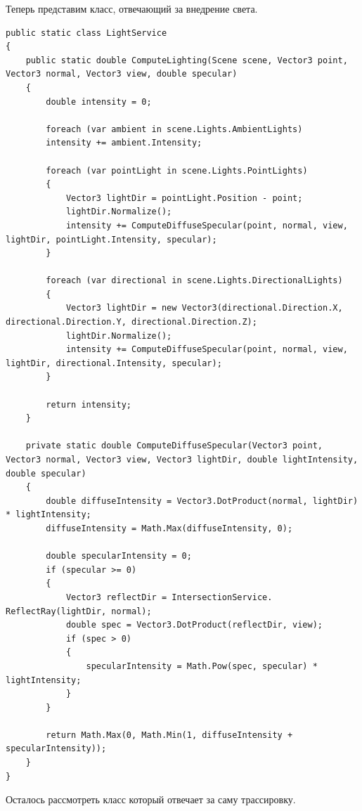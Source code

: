 Теперь представим класс, отвечающий за внедрение света.
\begin{lstlisting}[caption={Класс LightService}, label={lst:3-3}]
public static class LightService
{
	public static double ComputeLighting(Scene scene, Vector3 point, Vector3 normal, Vector3 view, double specular)
	{
		double intensity = 0;
		
		foreach (var ambient in scene.Lights.AmbientLights)
		intensity += ambient.Intensity;
		
		foreach (var pointLight in scene.Lights.PointLights)
		{
			Vector3 lightDir = pointLight.Position - point;
			lightDir.Normalize();
			intensity += ComputeDiffuseSpecular(point, normal, view, lightDir, pointLight.Intensity, specular);
		}
		
		foreach (var directional in scene.Lights.DirectionalLights)
		{
			Vector3 lightDir = new Vector3(directional.Direction.X, directional.Direction.Y, directional.Direction.Z);
			lightDir.Normalize();
			intensity += ComputeDiffuseSpecular(point, normal, view, lightDir, directional.Intensity, specular);
		}
		
		return intensity;
	}
	
	private static double ComputeDiffuseSpecular(Vector3 point, Vector3 normal, Vector3 view, Vector3 lightDir, double lightIntensity, double specular)
	{
		double diffuseIntensity = Vector3.DotProduct(normal, lightDir) * lightIntensity;
		diffuseIntensity = Math.Max(diffuseIntensity, 0);
		
		double specularIntensity = 0;
		if (specular >= 0)
		{
			Vector3 reflectDir = IntersectionService. ReflectRay(lightDir, normal);
			double spec = Vector3.DotProduct(reflectDir, view);
			if (spec > 0)
			{
				specularIntensity = Math.Pow(spec, specular) * lightIntensity;
			}
		}
		
		return Math.Max(0, Math.Min(1, diffuseIntensity + specularIntensity));
	}
}
\end{lstlisting}

Осталось рассмотреть класс который отвечает за саму трассировку.

